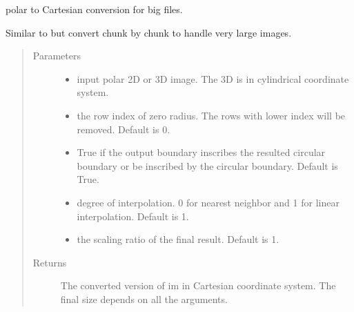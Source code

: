 \documentclass[letterpaper,10pt,english]{sphinxmanual}
\begin{document}

\begin{fulllineitems}
\label{\detokenize{index:util.polar2cartesian.polar2cartesian_large_3d_file}}
polar to Cartesian conversion for big files.

Similar to {\hyperref[\detokenize{index:util.polar2cartesian.polar2cartesian}]{}} but convert chunk by chunk to handle very large images.
\begin{quote}\begin{description}
\item[{Parameters}] \leavevmode\begin{itemize}
\item {} 
 \textendash{} input polar 2D or 3D image. The 3D is in cylindrical coordinate system.

\item {} 
 \textendash{} the row index of zero radius. The rows with lower index will be removed.  Default is 0.

\item {} 
 \textendash{} True if the output boundary inscribes the resulted circular boundary or be inscribed by the circular
boundary.  Default is True.

\item {} 
 \textendash{} degree of interpolation.  0 for nearest neighbor and 1 for linear interpolation.  Default is 1.

\item {} 
 \textendash{} the scaling ratio of the final result.  Default is 1.

\end{itemize}

\item[{Returns}] \leavevmode
The converted version of im in Cartesian coordinate system.  The final size depends on all the arguments.

\end{description}\end{quote}

\end{fulllineitems}
\end{document}
